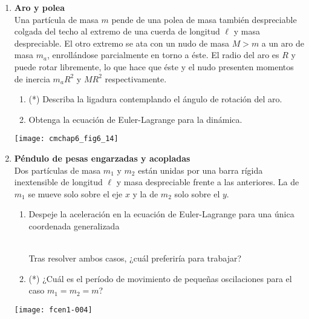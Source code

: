 \documentclass[11pt, spanish, a4paper, twoside]{article}
\begin{document}
\begin{enumerate}
\item 
\begin{minipage}[t][4.5cm]{0.75\textwidth}
\textbf{Aro y polea}\\
	Una partícula de masa \(m\) pende de una polea de masa también despreciable colgada del techo al extremo de una cuerda de longitud \(\ell\) y masa despreciable.
	El otro extremo se ata con un nudo de masa \(M> m\) a un aro de masa \(m_a\), enrollándose parcialmente en torno a éste.
	El radio del aro es \(R\) y puede rotar libremente, lo que hace que éste y el nudo presenten momentos de inercia \(m_a R^2\) y \(M R^2\) respectivamente.
	\begin{enumerate}
		\item (*) Describa la ligadura contemplando el ángulo de rotación del aro.
		\item Obtenga la ecuación de Euler-Lagrange para la dinámica.
\end{enumerate}
\end{minipage}
\begin{minipage}[c][0cm][t]{0.2\textwidth}
	\texttt{[image: cmchap6\_fig6\_14]}
\end{minipage}


\item 
\begin{minipage}[t][5.5cm]{0.7\textwidth}
	\textbf{Péndulo de pesas engarzadas y acopladas}\\ 
	Dos partículas de masa \(m_1\) y \(m_2\) están unidas por una barra rígida inextensible de longitud \(\ell\) y masa despreciable frente a las anteriores.
	La de \(m_1\) se mueve solo sobre el eje \(x\) y la de \(m_2\) solo sobre el \(y\).
\begin{enumerate}
	\item Despeje la aceleración en la ecuación de Euler-Lagrange para una única coordenada generalizada\\
	\\ %
	Tras resolver ambos casos, ¿cuál preferiría para trabajar?
	\item (*) ¿Cuál es el período de movimiento de pequeñas oscilaciones para el caso \(m_1 = m_2 = m\)?
\end{enumerate}
\end{minipage}
\begin{minipage}[c][0cm][t]{0.3\textwidth}
	\texttt{[image: fcen1-004]}
\end{minipage}



\end{enumerate}
\end{document}
